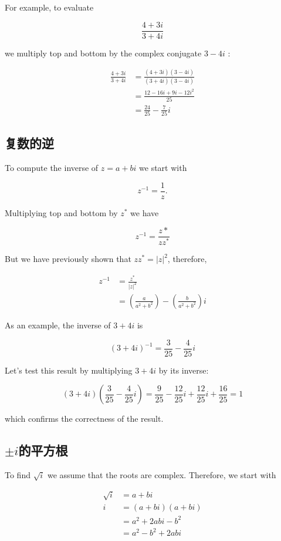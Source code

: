 For example, to evaluate

$$
\frac{4+3 i}{3+4 i}
$$

we multiply top and bottom by the complex conjugate $3-4 i$ :

$$
\begin{aligned}
\frac{4+3 i}{3+4 i} & =\frac{(4+3 i)(3-4 i)}{(3+4 i)(3-4 i)} \\
& =\frac{12-16 i+9 i-12 i^{2}}{25} \\
& =\frac{24}{25}-\frac{7}{25} i
\end{aligned}
$$

\subsection{复数的逆}
To compute the inverse of $z=a+b i$ we start with

$$
z^{-1}=\frac{1}{z} .
$$

Multiplying top and bottom by $z^{*}$ we have

$$
z^{-1}=\frac{z *}{z z^{*}}
$$

But we have previously shown that $z z^{*}=|z|^{2}$, therefore,

$$
\begin{aligned}
z^{-1} & =\frac{z^{*}}{|z|^{2}} \\
& =\left(\frac{a}{a^{2}+b^{2}}\right)-\left(\frac{b}{a^{2}+b^{2}}\right) i
\end{aligned}
$$

As an example, the inverse of $3+4 i$ is

$$
(3+4 i)^{-1}=\frac{3}{25}-\frac{4}{25} i
$$

Let's test this result by multiplying $3+4 i$ by its inverse:

$$
(3+4 i)\left(\frac{3}{25}-\frac{4}{25} i\right)=\frac{9}{25}-\frac{12}{25} i+\frac{12}{25} i+\frac{16}{25}=1
$$

which confirms the correctness of the result.

\subsection{\boldmath $\pm i$的平方根}
To find $\sqrt{i}$ we assume that the roots are complex. Therefore, we start with

$$
\begin{aligned}
\sqrt{i} & =a+b i \\
i & =(a+b i)(a+b i) \\
& =a^{2}+2 a b i-b^{2} \\
& =a^{2}-b^{2}+2 a b i
\end{aligned}
$$

